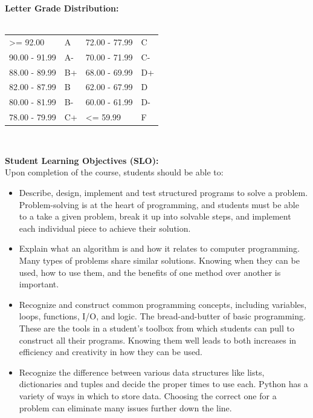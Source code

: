 \documentclass[11pt]{article}
\begin{document}
\textbf {\large Letter Grade Distribution:} \\\\
\hspace*{40mm}
\begin{tabular}{ l l | l l }
\textgreater= 92.00 & A & 72.00 - 77.99 & C \\
90.00 - 91.99 & A-  & 70.00 - 71.99 & C- \\
88.00 - 89.99 & B+  & 68.00 - 69.99 & D+ \\
82.00 - 87.99 & B  & 62.00 - 67.99 & D \\
80.00 - 81.99 & B-  & 60.00 - 61.99 & D- \\
78.00 - 79.99 & C+  & \textless= 59.99 & F \\
\end{tabular} \\

\vspace{0.25cm}

\textbf {\large Student Learning Objectives (SLO):} \\
Upon completion of the course, students should be able to:
\begin{itemize}
	\item Describe, design, implement and test structured programs to solve a problem. Problem-solving is at the heart of programming, and students must be able to a take a given problem, break it up into solvable steps, and implement each individual piece to achieve their solution.
	\item Explain what an algorithm is and how it relates to computer programming. Many types of problems share similar solutions. Knowing when they can be used, how to use them, and the benefits of one method over another is important.
	\item Recognize and construct common programming concepts, including variables, loops, functions, I/O, and logic. The bread-and-butter of basic programming. These are the tools in a student's toolbox from which students can pull to construct all their programs. Knowing them well leads to both increases in efficiency and creativity in how they can be used.
	\item Recognize the difference between various data structures like lists, dictionaries and tuples and decide the proper times to use each. Python has a variety of ways in which to store data. Choosing the correct one for a problem can eliminate many issues further down the line.
\end{itemize}
\end{document}
